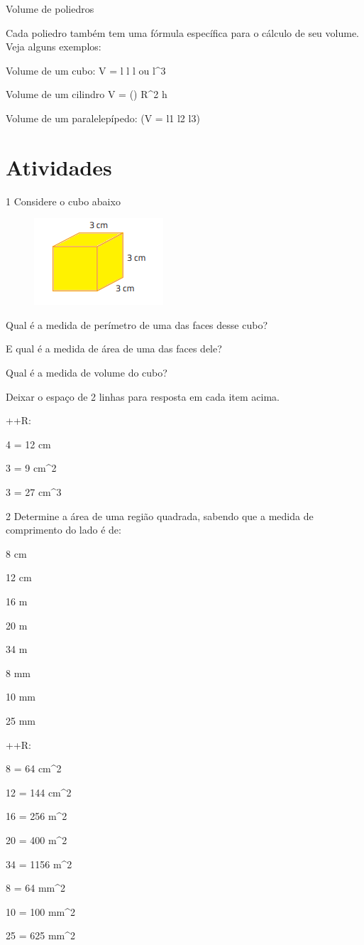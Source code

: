 Volume de poliedros

Cada poliedro também tem uma fórmula específica para o cálculo de seu
volume. Veja alguns exemplos:

Volume de um cubo: V = l \cdot l \cdot l ou l^3

Volume de um cilindro V = (\Pi) \cdot R^2 \cdot h

Volume de um paralelepípedo: (V = l1 \cdot l2 \cdot l3)

\section{Atividades}

\num{1} Considere o cubo abaixo

\begin{figure}[H]
\centering\includegraphics[width=1.89583in,height=1.27083in]{./imgSAEB_8_MAT/media/image42.png}
\end{figure}
\item Qual é a medida de perímetro de uma das faces desse cubo?
\item E qual é a medida de área de uma das faces dele?
\item Qual é a medida de volume do cubo?

Deixar o espaço de 2 linhas para resposta em cada item acima.

++R:
\item 4  = 12 cm
\item 3  = 9 cm^2
\item 3   = 27 cm^3

\num{2} Determine a área de uma região quadrada, sabendo que a medida de
comprimento do lado é de:
\item 8 cm
\item 12 cm
\item 16 m
\item 20 m
\item 34 m
\item 8 mm
\item 10 mm
\item 25 mm

++R:
\item 8  = 64 cm^2
\item 12  = 144 cm^2
\item16 = 256 m^2
\item20  = 400 m^2
\item34 = 1156 m^2
\item 8  = 64 mm^2
\item 10  = 100 mm^2
\item 25  = 625 mm^2


